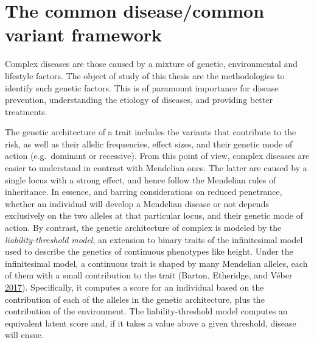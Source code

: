 \documentclass[
  11pt,
]{env/yjiao}
\begin{document}
\hypertarget{the-common-diseasecommon-variant-framework}{%
\section{The common disease/common variant framework}\label{the-common-diseasecommon-variant-framework}}

Complex diseases are those caused by a mixture of genetic, environmental and lifestyle factors. The object of study of this thesis are the methodologies to identify such genetic factors. This is of paramount importance for disease prevention, understanding the etiology of diseases, and providing better treatments.

The genetic architecture of a trait includes the variants that contribute to the risk, as well as their allelic frequencies, effect sizes, and their genetic mode of action (e.g.~dominant or recessive). From this point of view, complex diseases are easier to understand in contrast with Mendelian ones. The latter are caused by a single locus with a strong effect, and hence follow the Mendelian rules of inheritance. In essence, and barring considerations on reduced penetrance, whether an individual will develop a Mendelian disease or not depends exclusively on the two alleles at that particular locus, and their genetic mode of action. By contrast, the genetic architecture of complex is modeled by the \emph{liability-threshold model}, an extension to binary traits of the infinitesimal model used to describe the genetics of continuous phenotypes like height. Under the infinitesimal model, a continuous trait is shaped by many Mendelian alleles, each of them with a small contribution to the trait (Barton, Etheridge, and Véber \protect\hyperlink{ref-barton_infinitesimal_2017}{2017}). Specifically, it computes a score for an individual based on the contribution of each of the alleles in the genetic architecture, plus the contribution of the environment. The liability-threshold model computes an equivalent latent score and, if it takes a value above a given threshold, disease will ensue.
\end{document}

